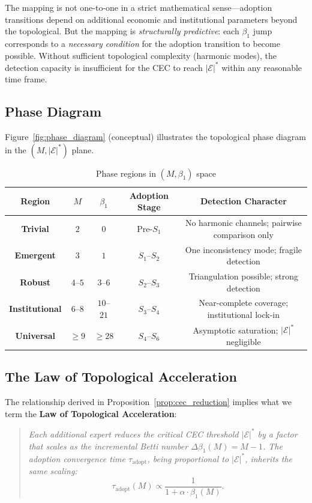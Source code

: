 \documentclass[12pt,a4paper]{article}
\theoremstyle{definition}
\theoremstyle{remark}
\theoremstyle{definition}
\newcommand{\CEC}{\mathcal{E}}
\newcommand{\CECstar}{|\CEC|^*}
\begin{document}
The mapping is not one-to-one in a strict mathematical sense---adoption transitions depend on additional economic and institutional parameters beyond the topological. But the mapping is \emph{structurally predictive}: each $\beta_1$ jump corresponds to a \emph{necessary condition} for the adoption transition to become possible. Without sufficient topological complexity (harmonic modes), the detection capacity is insufficient for the CEC to reach $\CECstar$ within any reasonable time frame.

\subsection{Phase Diagram}

Figure~\ref{fig:phase_diagram} (conceptual) illustrates the topological phase diagram in the $(M, \CECstar)$ plane.

\begin{table}[H]
  \centering
  \caption{Phase regions in $(M, \beta_1)$ space}
  \label{tab:phase_regions}
  \begin{tabular}{@{}c c c c c@{}}
    \toprule
    Region & $M$ & $\beta_1$ & Adoption Stage & Detection Character \\
    \midrule
    \textbf{Trivial} & $2$ & $0$ & Pre-$S_1$ & No harmonic channels; pairwise comparison only \\
    \textbf{Emergent} & $3$ & $1$ & $S_1$--$S_2$ & One inconsistency mode; fragile detection\\
    \textbf{Robust} & $4$--$5$ & $3$--$6$ & $S_2$--$S_3$ & Triangulation possible; strong detection\\
    \textbf{Institutional} & $6$--$8$ & $10$--$21$ & $S_3$--$S_4$ & Near-complete coverage; institutional lock-in\\
    \textbf{Universal} & $\geq 9$ & $\geq 28$ & $S_4$--$S_6$ & Asymptotic saturation; $\CECstar$ negligible\\
    \bottomrule
  \end{tabular}
\end{table}

\subsection{The Law of Topological Acceleration}

The relationship derived in Proposition~\ref{prop:cec_reduction} implies what we term the \textbf{Law of Topological Acceleration}:

\begin{quote}
  \emph{Each additional expert reduces the critical CEC threshold $\CECstar$ by a factor that scales as the incremental Betti number $\Delta\beta_1(M) = M-1$. The adoption convergence time $\tau_{\text{adopt}}$, being proportional to $\CECstar$, inherits the same scaling:}
  \begin{equation}\label{eq:tau_adopt}
    \tau_{\text{adopt}}(M) \propto \frac{1}{1 + \alpha \cdot \beta_1(M)}.
  \end{equation}
\end{quote}
\end{document}
